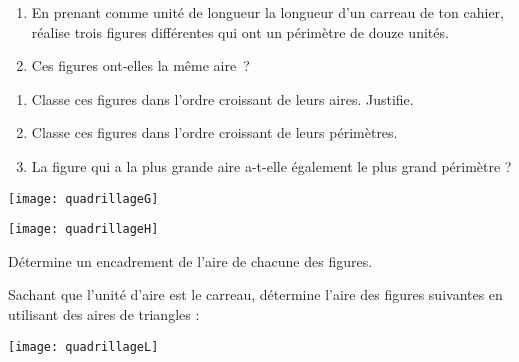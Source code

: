 \begin{exercice}
\begin{enumerate}
 \item En prenant comme unité de longueur la longueur d'un carreau de ton cahier, réalise trois figures différentes qui ont un périmètre de douze unités.
 \item Ces figures ont‑elles la même aire ?
 \end{enumerate}
\end{exercice}

\begin{exercice}[Comparaisons]
\begin{enumerate}
 \item Classe ces figures dans l'ordre croissant de leurs aires. Justifie.
 \item Classe ces figures dans l'ordre croissant de leurs périmètres.
 \item La figure qui a la plus grande aire a-t-elle également le plus grand périmètre ?
 \end{enumerate}
\begin{center} \texttt{[image: quadrillageG]} \end{center}
\end{exercice}

\begin{exercice}
\begin{center} \texttt{[image: quadrillageH]} \end{center}

Détermine un encadrement de l'aire de chacune des figures.
\end{exercice}


\begin{exercice}
Sachant que l'unité d'aire est le carreau, détermine l'aire des figures suivantes en utilisant des aires de triangles :
\begin{center} \texttt{[image: quadrillageL]} \end{center} 
\end{exercice}



\newpage



